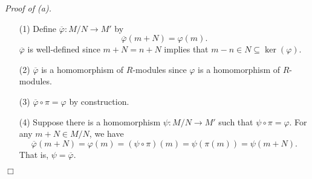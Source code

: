 \documentclass{article}
\begin{document}
\emph{Proof of (a).}
\begin{enumerate}
\item[(1)]
  Define $\overline{\varphi}: M/N \to M'$ by
  \[
    \overline{\varphi}(m + N) = \varphi(m).
  \]
  $\overline{\varphi}$ is well-defined since
  $m + N = n + N$ implies that $m - n \in N \subseteq \ker(\varphi)$.

\item[(2)]
  $\overline{\varphi}$ is a homomorphism of $R$-modules
  since $\varphi$ is a homomorphism of $R$-modules.

\item[(3)]
  $\overline{\varphi} \circ \pi = \varphi$ by construction.

\item[(4)]
  Suppose there is a homomorphism $\psi: M/N \to M'$
  such that $\psi \circ \pi = \varphi$.
  For any $m + N \in M/N$, we have
  \[
    \overline{\varphi}(m + N)
    = \varphi(m)
    = (\psi \circ \pi)(m)
    = \psi(\pi(m))
    = \psi(m + N).
  \]
  That is, $\psi = \overline{\varphi}$.
\end{enumerate}
$\Box$ \\
\end{document}
